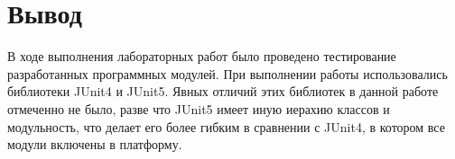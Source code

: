 \documentclass[a4paper,10pt]{article}
\begin{document}
\section*{Вывод}
    В ходе выполнения лабораторных работ было проведено тестирование разработанных программных модулей.
    При выполнении работы использовались библиотеки JUnit4 и JUnit5. Явных отличий этих библиотек
    в данной работе отмеченно не было, разве что JUnit5 имеет иную иерахию классов и модульность, 
    что делает его более гибким в сравнении с JUnit4, в котором все модули включены в платформу.
\end{document}
